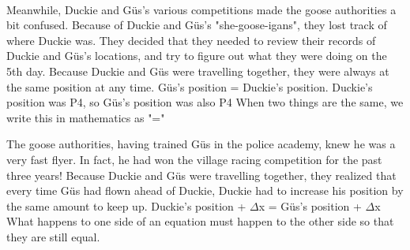 \documentclass[a4paper,11pt ]{book}
\begin{document}
\paragraph{} Meanwhile, Duckie and Güs's various competitions made the goose authorities a bit confused. Because of Duckie and Güs's "she-goose-igans", they lost track of where Duckie was. They decided that they needed to review their records of Duckie and Güs's locations, and try to figure out what they were doing on the 5th day. 
\vfill
\pagebreak
{Because Duckie and Güs were travelling together, they were always at the same position at any time.}
{Güs's position = Duckie's position. Duckie's position was P4, so Güs's position was also P4}
{When two things are the same, we write this in mathematics as "="}
{}
{The goose authorities, having trained Güs in the police academy, knew he was a very fast flyer. In fact, he had won the village racing competition for the past three years! Because Duckie and Güs were travelling together, they realized that every time Güs had flown ahead of Duckie, Duckie had to increase his position by the same amount to keep up.}
{Duckie's position + $\Delta$x = Güs's position + $\Delta$x}
{What happens to one side of an equation must happen to the other side so that they are still equal.}
\end{document}
